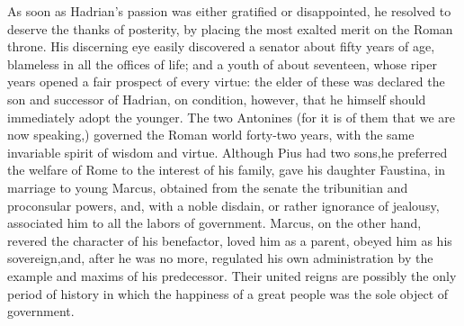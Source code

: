 

As soon as Hadrian’s passion was either gratified or
disappointed, he resolved to deserve the thanks of posterity, by
placing the most exalted merit on the Roman throne. His
discerning eye easily discovered a senator about fifty years of
age, blameless in all the offices of life; and a youth of about
seventeen, whose riper years opened a fair prospect of every
virtue: the elder of these was declared the son and successor of
Hadrian, on condition, however, that he himself should
immediately adopt the younger. The two Antonines (for it is of
them that we are now speaking,) governed the Roman world
forty-two years, with the same invariable spirit of wisdom and
virtue. Although Pius had two sons,\footnotemark[42] he preferred the welfare
of Rome to the interest of his family, gave his daughter
Faustina, in marriage to young Marcus, obtained from the senate
the tribunitian and proconsular powers, and, with a noble
disdain, or rather ignorance of jealousy, associated him to all
the labors of government. Marcus, on the other hand, revered the
character of his benefactor, loved him as a parent, obeyed him as
his sovereign,\footnotemark[43] and, after he was no more, regulated his own
administration by the example and maxims of his predecessor.
Their united reigns are possibly the only period of history in
which the happiness of a great people was the sole object of
government.


